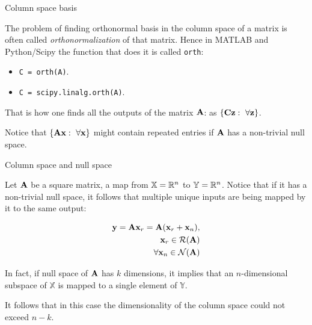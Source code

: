 \documentclass{beamer}
\begin{document}
\begin{frame}{Column space basis}
\begin{flushleft}

The problem of finding orthonormal basis in the column space of a matrix is often called \emph{orthonormalization} of that matrix. Hence in MATLAB and Python/Scipy the function that does it is called \texttt{orth}:

\bigskip

\begin{itemize}
    \item \texttt{C = orth(A)}.
    \item \texttt{C = scipy.linalg.orth(A)}.
\end{itemize}

\bigskip

That is how one finds all the outputs of the matrix $\mathbf{A}$: as $\{ \mathbf{C}\mathbf{z}: \ \forall \mathbf{z} \}$. 

Notice that $\{ \mathbf{A}\mathbf{x}: \ \forall \mathbf{x} \}$ might contain repeated entries if $\mathbf{A}$ has a non-trivial null space.

\end{flushleft}
\end{frame}



\begin{frame}{Column space and null space}
\begin{flushleft}

Let $\mathbf{A}$ be a square matrix, a map from $\mathbb{X} = \mathbb{R}^n$ to $\mathbb{Y} = \mathbb{R}^n$. Notice that if it has a non-trivial null space, it follows that multiple unique inputs are being mapped by it to the same output:

\begin{equation}
  \begin{aligned}
    \mathbf{y} = \mathbf{A} \mathbf{x}_r = \mathbf{A} (\mathbf{x}_r + \mathbf{x}_n), \\
    \mathbf{x}_r \in \mathcal{R}(\mathbf{A}) \\
    \forall \mathbf{x}_n \in \mathcal{N}(\mathbf{A}) \\
  \end{aligned}
\end{equation}

In fact, if null space of $\mathbf{A}$ has $k$ dimensions, it implies that an $n$-dimensional subspace of $\mathbb{X}$ is mapped to a single element of $\mathbb{Y}$. 

\bigskip

It follows that in this case the dimensionality of the column space could not exceed $n-k$.

\end{flushleft}
\end{frame}
\end{document}
